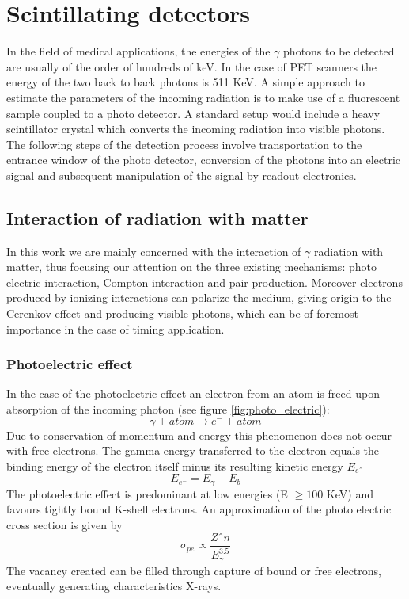 

\chapter{Scintillating detectors}

In the field of medical applications, the energies of the $\gamma$ photons to be detected are usually of the order of hundreds of keV. In the case of PET scanners the energy of the two back to back photons is 511 KeV.
A simple approach to estimate the parameters of the incoming radiation is to make use of a fluorescent sample coupled to a photo detector. A standard setup would include a heavy scintillator crystal which converts the incoming radiation into visible photons. The following steps of the detection process involve transportation to the entrance window of the photo detector, conversion of the photons into an electric signal and subsequent manipulation of the signal by readout electronics.  


\section{Interaction of radiation with matter}
In this work we are mainly concerned with the interaction of $\gamma$ radiation with matter, thus focusing our attention on the three existing mechanisms: photo electric interaction, Compton interaction and pair production.
Moreover electrons produced by ionizing interactions can polarize the medium, giving origin to the Cerenkov effect and producing visible photons, which can be of foremost importance in the case of timing application.

\subsection{Photoelectric effect}

In the case of the photoelectric effect an electron from an atom is freed upon absorption of the incoming photon (see figure \ref{fig:photo_electric}):
\begin{equation}
\gamma + atom \rightarrow e^{-} + atom
\end{equation}
Due to conservation of momentum and energy this phenomenon does not occur with free electrons. 
The gamma energy transferred to the electron equals the binding energy of the electron itself minus its resulting kinetic energy $E_{eˆ{-}}$ 
\begin{equation}
E_{e^{-}} = E_{\gamma} - E_{b}
\end{equation}
The photoelectric effect is predominant at low energies (E $\geq 100$ KeV) and favours tightly bound K-shell electrons. An approximation of the photo electric cross section is given by
\begin{equation}
\sigma _{pe} \propto \frac{Zˆ{n}}{E_{\gamma}^{3.5}}
\end{equation}
The vacancy created can be filled through capture of bound or free electrons, eventually generating characteristics X-rays.  

